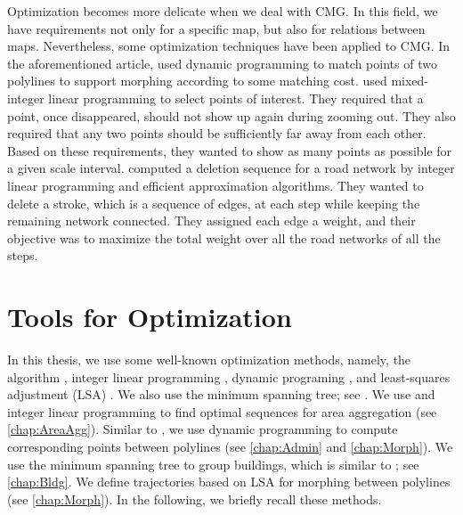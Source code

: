 Optimization becomes more delicate
when we deal with CMG.
In this field, we have requirements 
not only for a specific map, 
but also for relations between maps. 
%
Nevertheless, some optimization techniques 
have been applied to CMG.
In the aforementioned article,
\textcite{Noellenburg2008} used dynamic programming
to match points of two polylines to support morphing
according to some matching cost.
\textcite{sahw-oarps-ICAGW13} used 
mixed-integer linear programming 
to select points of interest.
They required that 
a point, once disappeared, should not show up again 
during zooming out. 
They also required that any two points should be 
sufficiently far away from each other.
Based on these requirements, 
they wanted to show as many points as possible 
for a given scale interval.
\textcite{Chimani2014Eat} computed a deletion sequence
for a road network by integer linear programming
and efficient approximation algorithms.
They wanted to delete a stroke, 
which is a sequence of edges, at each step
while keeping the remaining network connected.
They assigned each edge a weight, 
and their objective was to maximize the total weight 
over all the road networks of all the steps.

\section{Tools for Optimization}
\label{sec:Intro_Tools}

In this thesis, we use some well-known optimization methods,
namely, the \Astar algorithm \parencite{Hart1968}, 
integer linear programming
\parencite[chapter~13]{Papadimitriou1982combinatorial},
dynamic programing \parencite[chapter~15]{Cormen2009}, and
least-squares adjustment (LSA) \parencite[chapter~3]{Koch1988}.
We also use the minimum spanning tree;
see \textcite[chapter~23]{Cormen2009}.
%
We use \Astar and integer linear programming 
to find optimal sequences for 
area aggregation (see \chap\ref{chap:AreaAgg}).
Similar to \textcite{Noellenburg2008},
we use dynamic programming to 
compute corresponding points between polylines
(see \chaps\ref{chap:Admin} and \ref{chap:Morph}).
We use the minimum spanning tree to group buildings,
which is similar to \textcite{Regnauld2001}; 
see \chap\ref{chap:Bldg}.
We define trajectories based on LSA 
for morphing between polylines (see \chap\ref{chap:Morph}).
In the following, we briefly recall these methods.


